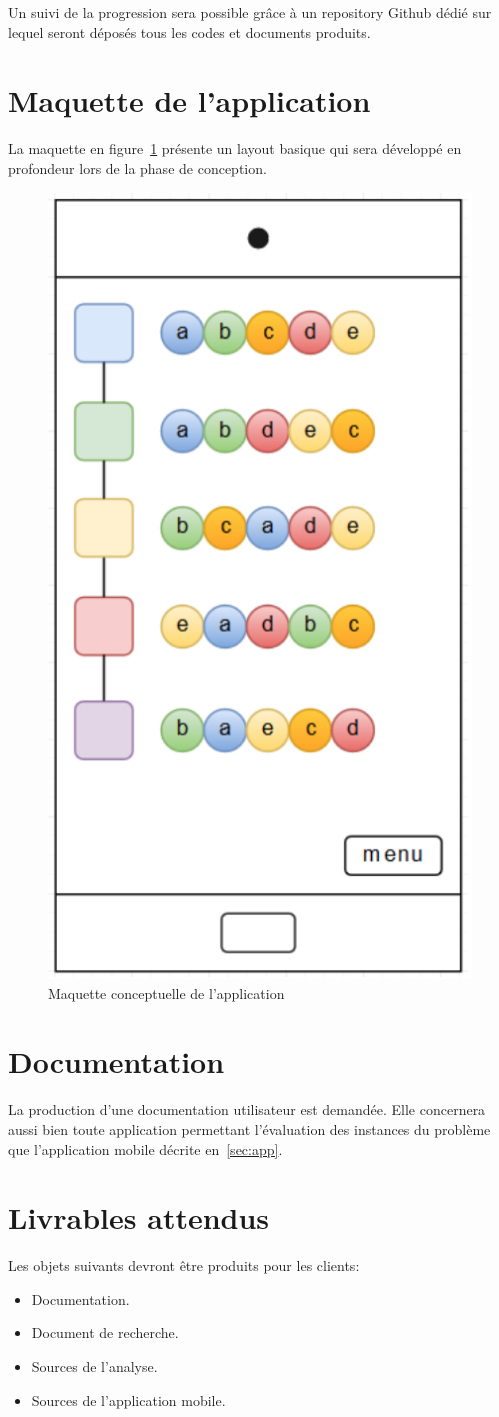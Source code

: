 \documentclass[a4paper, 11pt, titlepage, oneside]{report}
\begin{document}
Un suivi de la progression sera possible grâce à un repository Github dédié sur lequel seront déposés tous les codes et documents produits.

	\section{Maquette de l'application}
	
	La maquette en figure~\ref{fig:mockup} présente un layout basique qui sera développé en profondeur lors de la phase de conception.

	\begin{figure}[h!]
		\centering
		\includegraphics[width=0.3\linewidth]{maquette.png}
		\caption{Maquette conceptuelle de l'application}
		\label{fig:mockup}
	\end{figure}
	
	\section{Documentation}
	
	La production d’une documentation utilisateur est demandée. Elle concernera aussi bien toute application permettant l’évaluation des instances du problème que l’application mobile décrite en~\ref{sec:app}.
	
	\section{Livrables attendus}
	
	Les objets suivants devront être produits pour les clients:
	\begin{itemize}
		\item Documentation.
		\item Document de recherche.
		\item Sources de l’analyse.
		\item Sources de l’application mobile.
	\end{itemize}
	
\end{document}
